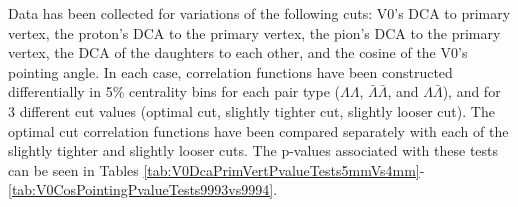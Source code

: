

Data has been collected for variations of the following cuts: V0's DCA to primary vertex, the proton's DCA to the primary vertex, the pion's DCA to the primary vertex, the DCA of the daughters to each other, and the cosine of the V0's pointing angle.  
In each case, correlation functions have been constructed differentially in 5\% centrality bins for each pair type ($\Lambda\Lambda$, $\bar{\Lambda}\bar{\Lambda}$, and $\Lambda\bar{\Lambda}$), and for 3 different cut values (optimal cut, slightly tighter cut, slightly looser cut).  
The optimal cut correlation functions have been compared separately with each of the slightly tighter and slightly looser cuts.  
The p-values associated with these tests can be seen in Tables \ref{tab:V0DcaPrimVertPvalueTests5mmVs4mm}-\ref{tab:V0CosPointingPvalueTests9993vs9994}.

